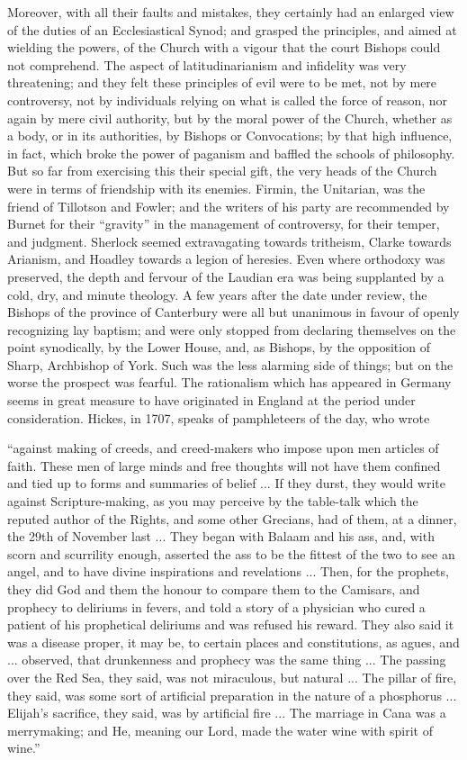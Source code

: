 Moreover, with all their
faults and mistakes, they certainly had an enlarged view of the duties
of an Ecclesiastical Synod; and grasped the principles, and aimed at
wielding the powers, of the Church with a vigour that the court
Bishops could not comprehend. The aspect of latitudinarianism and
infidelity was very threatening; and they felt these principles of
evil were to be met, not by mere controversy, not by individuals
relying on what is called the force of reason, nor again by mere civil
authority, but by the moral power of the Church, whether as a body, or
in its authorities, by Bishops or Convocations; by that high
influence, in fact, which broke the power of paganism and baffled the
schools of philosophy. But so far from exercising this their special
gift, the very heads of the Church were in terms of friendship with
its enemies. Firmin, the Unitarian, was the friend of Tillotson and
Fowler; and the writers of his party are recommended by Burnet for
their ``gravity'' in the management of controversy, for their temper,
and judgment. Sherlock seemed extravagating towards tritheism, Clarke
towards Arianism, and Hoadley towards a legion of heresies. Even where
orthodoxy was preserved, the depth and fervour of the Laudian era was
being supplanted by a cold, dry, and minute theology. A few years
after the date under review, the Bishops of the province of Canterbury
were all but unanimous in favour of openly recognizing lay baptism;
and were only stopped from declaring themselves on the point
synodically, by the Lower House, and, as Bishops, by the opposition of
Sharp, Archbishop of York. Such was the less alarming side of things;
but on the worse the prospect was fearful. The rationalism which has
appeared in Germany seems in great measure to have originated in
England at the period under consideration. Hickes, in 1707,
speaks of pamphleteers of the day, who wrote

``against making of creeds, and creed-makers who impose upon men articles
of faith. These men of large minds and free thoughts will not have
them confined and tied up to forms and summaries of belief ... If they
durst, they would write against Scripture-making, as you may perceive
by the table-talk which the reputed author of the Rights, and some
other Grecians, had of them, at a dinner, the 29th of November last
... They began with Balaam and his ass, and, with scorn and scurrility
enough, asserted the ass to be the fittest of the two to see an angel,
and to have divine inspirations and revelations ... Then, for the
prophets, they did God and them the honour to compare them to the
Camisars, and prophecy to deliriums in fevers, and told a story of a
physician who cured a patient of his prophetical deliriums and was
refused his reward. They also said it was a disease proper, it may be,
to certain places and constitutions, as agues, and ... observed, that
drunkenness and prophecy was the same thing ... The passing over the
Red Sea, they said, was not miraculous, but natural ... The pillar of
fire, they said, was some sort of artificial preparation in the nature
of a phosphorus ... Elijah's sacrifice, they said, was by artificial
fire ... The marriage in Cana was a merrymaking; and He, meaning our
Lord, made the water wine with spirit of wine.''

